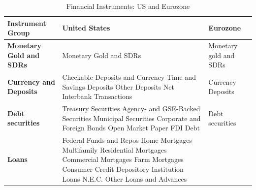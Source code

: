 \begin{table}[ht!]
\centering
\caption{Financial Instruments: US and Eurozone}
\label{tab:instrument_mapping}
\small
\begin{tabular}{@{} >{\raggedright\arraybackslash}p{3cm} >{\raggedright\arraybackslash}p{6.5cm} >{\raggedright\arraybackslash}p{5.5cm} @{}}
\toprule
\textbf{Instrument Group} & \textbf{United States} & \textbf{Eurozone} \\
\midrule
\textbf{Monetary Gold and SDRs} & 
Monetary Gold and SDRs & 
Monetary gold and SDRs \\
\midrule
\textbf{Currency and Deposits} & 
Checkable Deposits and Currency \newline 
Time and Savings Deposits \newline 
Other Deposits \newline 
Net Interbank Transactions & 
Currency \newline
Deposits \\
\midrule
\textbf{Debt securities} & 
Treasury Securities \newline 
Agency- and GSE-Backed Securities \newline 
Municipal Securities \newline 
Corporate and Foreign Bonds \newline 
Open Market Paper \newline 
FDI Debt & 
Debt securities \\
\midrule
\textbf{Loans} & 
Federal Funds and Repos \newline 
Home Mortgages \newline 
Multifamily Residential Mortgages \newline 
Commercial Mortgages \newline 
Farm Mortgages \newline 
Consumer Credit \newline 
Depository Institution Loans N.E.C. \newline 
Other Loans and Advances & 

\end{tabular}
\end{table}

